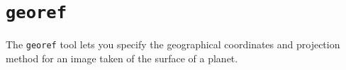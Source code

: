 

\section{{\tt georef}}\label{sec:georef}

The \verb#georef# tool lets you specify the geographical coordinates and projection method for an image taken of the surface of a planet. 

